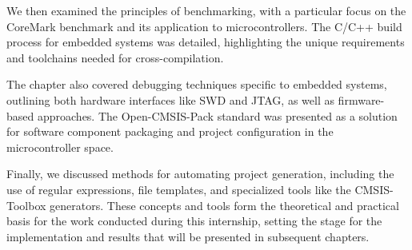 We then examined the principles of benchmarking, with a particular focus on the CoreMark benchmark and its application to microcontrollers. The C/C++ build process for embedded systems was detailed, highlighting the unique requirements and toolchains needed for cross-compilation.

The chapter also covered debugging techniques specific to embedded systems, outlining both hardware interfaces like SWD and JTAG, as well as firmware-based approaches. The Open-CMSIS-Pack standard was presented as a solution for software component packaging and project configuration in the microcontroller space.

Finally, we discussed methods for automating project generation, including the use of regular expressions, file templates, and specialized tools like the CMSIS-Toolbox generators. These concepts and tools form the theoretical and practical basis for the work conducted during this internship, setting the stage for the implementation and results that will be presented in subsequent chapters.
